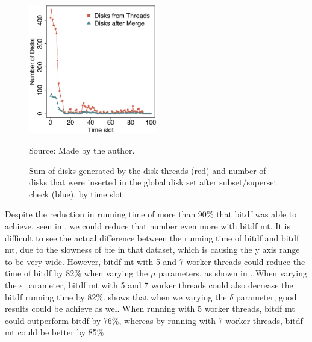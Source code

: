 {\begin{figure}[h!]
    \centering
    \caption{Sum of disks generated by the disk threads (red) and number of disks that were inserted in the global disk
        set after subset/superset check (blue), by time slot}
    \centerline{\includegraphics[width=0.5\textwidth]{images/Brinkhoff_disks_threads.eps}}
    \footnotesize{Source: Made by the author.}
    \label{fig:brinkhoff_disks_threads}
\end{figure}

Despite the reduction in running time of more than 90\% that \ac{bitdf} was able to achieve, seen in
, we could reduce that number even more with \ac{bitdf} \ac{mt}. It is difficult to see the actual
difference between the running time of \ac{bitdf} and \ac{bitdf} \ac{mt}, due to the slowness of \ac{bfe} in that
dataset, which is causing the y axis range to be very wide. However, \ac{bitdf} \ac{mt} with 5 and 7 worker threads
could reduce the time of \ac{bitdf} by 82\% when varying the $\mu$ parameters, as shown in
. When varying the $\epsilon$ parameter, \ac{bitdf} \ac{mt} with 5 and 7 worker
threads could also decrease the \ac{bitdf} running time by 82\%.  shows that when
we varying the $\delta$ parameter, good results could be achieve as wel. When running with 5 worker threads, \ac{bitdf}
\ac{mt} could outperform \ac{bitdf} by 76\%, whereas by running with 7 worker threads, \ac{bitdf} \ac{mt} could be
better by 85\%.

}
